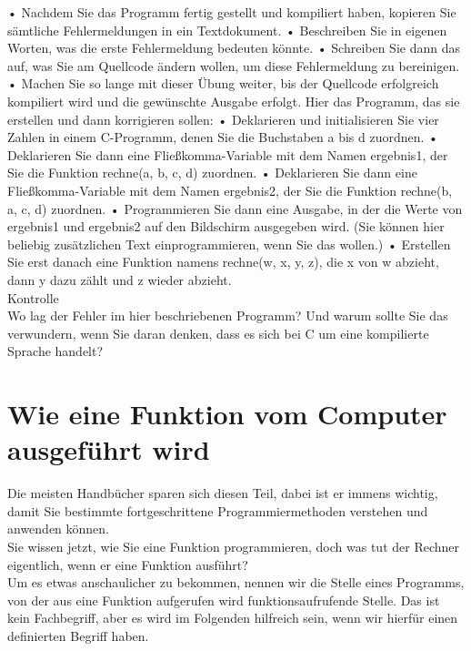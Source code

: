 •	Nachdem Sie das Programm fertig gestellt und kompiliert haben, kopieren Sie sämtliche Fehlermeldungen in ein Textdokument.
•	Beschreiben Sie in eigenen Worten, was die erste Fehlermeldung bedeuten könnte.
•	Schreiben Sie dann das auf, was Sie am Quellcode ändern wollen, um diese Fehlermeldung zu bereinigen.
•	Machen Sie so lange mit dieser Übung weiter, bis der Quellcode erfolgreich kompiliert wird und die gewünschte Ausgabe erfolgt.
Hier das Programm, das sie erstellen und dann korrigieren sollen: 
•	Deklarieren und initialisieren Sie vier Zahlen in einem C-Programm, denen Sie die Buchstaben a bis d zuordnen.
•	Deklarieren Sie dann eine Fließkomma-Variable mit dem Namen ergebnis1, der Sie die Funktion rechne(a, b, c, d) zuordnen.
•	Deklarieren Sie dann eine Fließkomma-Variable mit dem Namen ergebnis2, der Sie die Funktion rechne(b, a, c, d) zuordnen.
•	Programmieren Sie dann eine Ausgabe, in der die Werte von ergebnis1 und ergebnis2 auf den Bildschirm ausgegeben wird. (Sie können hier beliebig zusätzlichen Text einprogrammieren, wenn Sie das wollen.)
•	Erstellen Sie erst danach eine Funktion namens rechne(w, x, y, z), die x von w abzieht, dann y dazu zählt und z wieder abzieht. \\

Kontrolle\\

Wo lag der Fehler im hier beschriebenen Programm? Und warum sollte Sie das verwundern, wenn Sie daran denken, dass es sich bei C um eine kompilierte Sprache handelt?

\section{Wie eine Funktion vom Computer ausgeführt wird}

Die meisten Handbücher sparen sich diesen Teil, dabei ist er immens wichtig, damit Sie bestimmte fortgeschrittene Programmiermethoden verstehen und anwenden können.\\

Sie wissen jetzt, wie Sie eine Funktion programmieren, doch was tut der Rechner eigentlich, wenn er eine Funktion ausführt?\\

Um es etwas anschaulicher zu bekommen, nennen wir die Stelle eines Programms, von der aus eine Funktion aufgerufen wird funktionsaufrufende Stelle. Das ist kein Fachbegriff, aber es wird im Folgenden hilfreich sein, wenn wir hierfür einen definierten Begriff haben.\\


